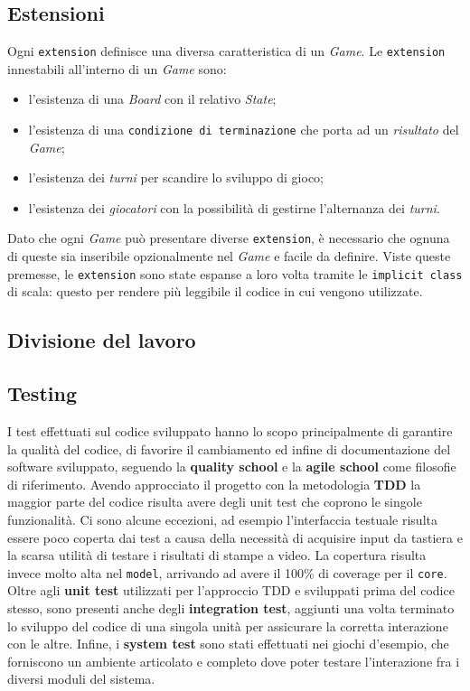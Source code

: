 
\subsection{Estensioni}
%
Ogni \texttt{extension} definisce una diversa caratteristica di un \textit{Game}.
%
Le \texttt{extension} innestabili all'interno di un \textit{Game} sono:
\begin{itemize}
  \item l'esistenza di una \textit{Board} con il relativo \textit{State};
  \item l'esistenza di una \texttt{condizione di terminazione} che porta ad un \textit{risultato} del \textit{Game};
  \item l'esistenza dei \textit{turni} per scandire lo sviluppo di gioco;
  \item l'esistenza dei \textit{giocatori} con la possibilità di gestirne l'alternanza dei \textit{turni}.
\end{itemize}
%
Dato che ogni \textit{Game} può presentare diverse \texttt{extension}, è necessario che ognuna di queste sia inseribile opzionalmente nel \textit{Game} e facile da definire.
%
Viste queste premesse, le \texttt{extension} sono state espanse a loro volta tramite le \texttt{implicit class} di scala: questo per rendere più leggibile il codice in cui vengono utilizzate.
%


\subsection{Divisione del lavoro}
\subsection{Testing}
I test effettuati sul codice sviluppato hanno lo scopo principalmente di garantire la qualità del codice, di favorire il cambiamento ed infine di documentazione del software sviluppato, seguendo la \textbf{quality school} e la \textbf{agile school} come filosofie di riferimento.
%
Avendo approcciato il progetto con la metodologia \textbf{TDD} la maggior parte del codice risulta avere degli unit test che coprono le singole funzionalità.
%
Ci sono alcune eccezioni, ad esempio l'interfaccia testuale risulta essere poco coperta dai test a causa della necessità di acquisire input da tastiera e la scarsa utilità di testare i risultati di stampe a video.
%
La copertura risulta invece molto alta nel \texttt{model}, arrivando ad avere il 100\% di coverage per il \texttt{core}.
%
Oltre agli \textbf{unit test} utilizzati per l'approccio TDD e sviluppati prima del codice stesso, sono presenti anche degli \textbf{integration test}, aggiunti una volta terminato lo sviluppo del codice di una singola unità per assicurare la corretta interazione con le altre.
%
Infine, i \textbf{system test} sono stati effettuati nei giochi d'esempio, che forniscono un ambiente articolato e completo dove poter testare l'interazione fra i diversi moduli del sistema.
%

